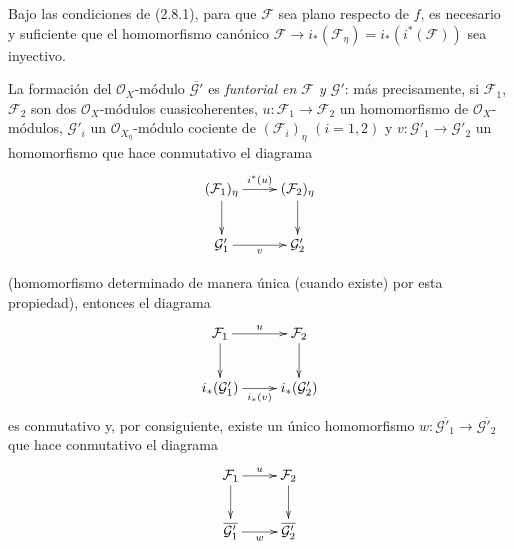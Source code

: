 \begin{corollary}[2.8.2]
\label{IV.2.8.2-fr}
Bajo las condiciones de \textup{(2.8.1)}, para que $\mathcal F$ sea plano respecto de
$f$, es necesario y suficiente que el homomorfismo canónico
$\mathcal F\to i_*(\mathcal F_\eta)=i_*(i^*(\mathcal F))$
sea inyectivo.
\end{corollary}

\begin{env}[2.8.3]
\label{IV.2.8.3-fr}
La formación del $\mathcal O_X$-módulo $\overline{\mathcal G'}$ es
\emph{funtorial en $\mathcal F$ y $\mathcal G'$}: más precisamente, si
$\mathcal F_1$, $\mathcal F_2$ son dos $\mathcal O_X$-módulos
cuasicoherentes, $u:\mathcal F_1\to\mathcal F_2$ un homomorfismo de
$\mathcal O_X$-módulos, $\mathcal G'_i$ un
$\mathcal O_{X_\eta}$-módulo cociente de $(\mathcal F_i)_\eta$ $(i=1,2)$ y
$v:\mathcal G'_1\to\mathcal G'_2$ un homomorfismo que hace conmutativo el
diagrama
\[
\xymatrix{
(\mathcal F_1)_\eta \ar[r]^{i^*(u)} \ar[d] &
(\mathcal F_2)_\eta \ar[d] \\
\mathcal G'_1 \ar[r]_v & \mathcal G'_2
}
\]

(homomorfismo determinado de manera única (cuando existe) por esta
propiedad), entonces el diagrama
\[
\xymatrix{
\mathcal F_1 \ar[r]^u \ar[d] & \mathcal F_2 \ar[d] \\
i_*(\mathcal G'_1) \ar[r]_{i_*(v)} & i_*(\mathcal G'_2)
}
\]
es conmutativo y, por consiguiente, existe un único homomorfismo
$w:\overline{\mathcal G'_1}\to\overline{\mathcal G'_2}$ que hace conmutativo
el diagrama
\[
\xymatrix{
\mathcal F_1 \ar[r]^u \ar[d] & \mathcal F_2 \ar[d] \\
\overline{\mathcal G'_1} \ar[r]_w & \overline{\mathcal G'_2}
}
\]
\end{env}
